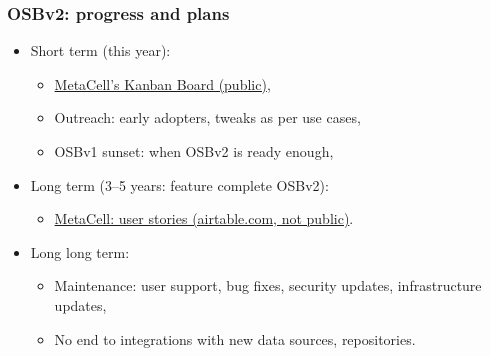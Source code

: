 \begin{frame}[c]
  \frametitle{OSBv2: progress and plans}
  \begin{itemize}
    \item Short term (this year):
      \begin{itemize}
        \item \href{https://app.zenhub.com/workspaces/open-source-brain-5c4f23e44c15c80eadb6c30d/board}{MetaCell's Kanban Board (public)},
        \item Outreach: early adopters, tweaks as per use cases,
        \item OSBv1 sunset: when OSBv2 is ready enough,
      \end{itemize}
      \pause{}
    \item Long term (3--5 years: feature complete OSBv2):
      \begin{itemize}
        \item \href{https://airtable.com}{MetaCell: user stories (airtable.com, not public)}.
      \end{itemize}
      \pause{}
    \item Long long term:
      \begin{itemize}
        \item Maintenance: user support, bug fixes, security updates, infrastructure updates,
        \item No end to integrations with new data sources, repositories.
      \end{itemize}
  \end{itemize}
\end{frame}



